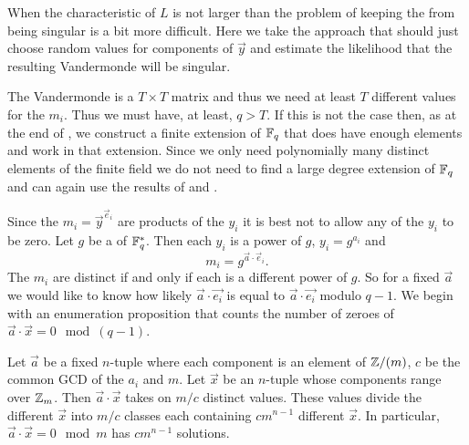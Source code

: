 When the characteristic of $L$ is not larger than  
the problem of keeping the  from being singular is a 
bit more difficult.  Here we take the approach that  should 
just choose random values for components of $\vec{y}$ and estimate the 
likelihood that the resulting Vandermonde will be singular. 

The Vandermonde is a $T \times T$ matrix and thus we need at
least $T$ different values for the $m_i$.  Thus we must have, at
least, $q > T$.  If this is not the case then, as at the end of
, we construct a finite extension
of $\mathbb{F}_q$ that does have enough elements and work in that extension.
Since we only need polynomially many distinct elements of the
finite field we do not need to find a large degree extension of
$\mathbb{F}_q$ and can again use the results of {\Adleman} and {\LenstraH}
\cite{Adelman1986-kb}. 

Since the $m_i = \vec{y}^{\vec{e}_i}$ are products of the $y_i$ it is
best not to allow any of the $y_i$ to be zero.  Let $g$ be a
 of $\mathbb{F}^{\ast}_q$.  Then each $y_i$ is a power of
$g$, $y_i = g^{a_i}$ and 
\[
m_i = g^{\vec{a}\cdot \vec{e}_i}.
\]
The $m_i$ are distinct if and only if each is a different power of
$g$.  So for a fixed $\vec{a}$ we would like to know how likely
$\vec{a} \cdot \vec{e_i}$ is equal to $\vec{a} \cdot \vec{e_i}$ modulo
$q-1$.  We begin with an enumeration proposition that counts the
number of zeroes of $\vec{a} \cdot \vec{x} = 0 \mod{(q-1)}$.

\begin{proposition} \label{SPMod:Count:Solns:Prop}
Let $\vec a$ be a fixed $n$-tuple where each component is
an element of $\mathbb{Z}/(m)$, $c$ be the common GCD of the $a_i$ and
$m$.  Let $\vec x$ be an $n$-tuple whose components range over $\mathbb{Z}_m$.  Then
$\vec a \cdot \vec x$ takes on $m/c$ distinct values.  These values
divide the different $\vec x$ into $m/c$ classes each containing $c
m^{n-1}$ different $\vec x$.  In particular, $\vec{a} \cdot \vec{x} =
0 \mod{m}$ has $c m^{n-1}$ solutions.
\end{proposition}

